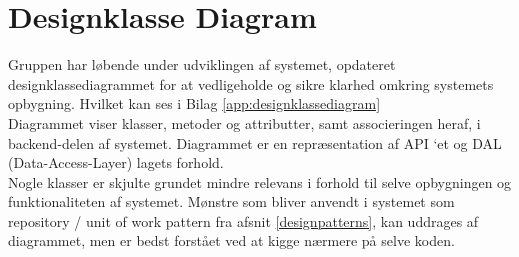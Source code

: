 \section{Designklasse Diagram}\label{Designklassediagram}
Gruppen har løbende under udviklingen af systemet, opdateret designklassediagrammet for at vedligeholde 
og sikre klarhed omkring systemets opbygning. Hvilket kan ses i Bilag \ref{app:designklassediagram}\\

Diagrammet viser klasser, metoder og attributter, samt associeringen heraf, i backend-delen af systemet. 
Diagrammet er en repræsentation af API ‘et og DAL (Data-Access-Layer) lagets forhold.\\

Nogle klasser er skjulte grundet mindre relevans i forhold til selve opbygningen og funktionaliteten af systemet. 
Mønstre som bliver anvendt i systemet som repository / unit of work pattern fra afsnit \ref{designpatterns}, 
kan uddrages af diagrammet, men er bedst forstået ved at kigge nærmere på selve koden.
